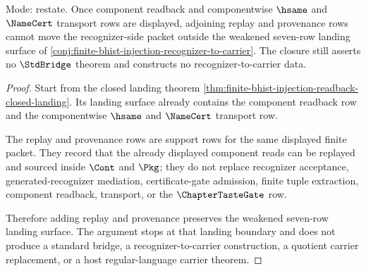 \begin{theorem}
\label{thm:finite-bhist-injection-readback-transport-closure}
Mode: restate. Once component readback and componentwise $\hsame$ and
$\NameCert$ transport rows are displayed, adjoining replay and provenance rows
cannot move the recognizer-side packet outside the weakened seven-row landing
surface of \autoref{conj:finite-bhist-injection-recognizer-to-carrier}. The
closure still asserts no $\StdBridge$ theorem and constructs no
recognizer-to-carrier data.
\end{theorem}
\begin{proof}
Start from the closed landing theorem
\autoref{thm:finite-bhist-injection-readback-closed-landing}. Its landing
surface already contains the component readback row and the componentwise
$\hsame$ and $\NameCert$ transport row.

The replay and provenance rows are support rows for the same displayed finite
packet. They record that the already displayed component reads can be replayed
and sourced inside $\Cont$ and $\Pkg$; they do not replace recognizer
acceptance, generated-recognizer mediation, certificate-gate admission, finite
tuple extraction, component readback, transport, or the $\ChapterTasteGate$
row.

Therefore adding replay and provenance preserves the weakened seven-row
landing surface. The argument stops at that landing boundary and does not
produce a standard bridge, a recognizer-to-carrier construction, a quotient
carrier replacement, or a host regular-language carrier theorem.
\end{proof}

